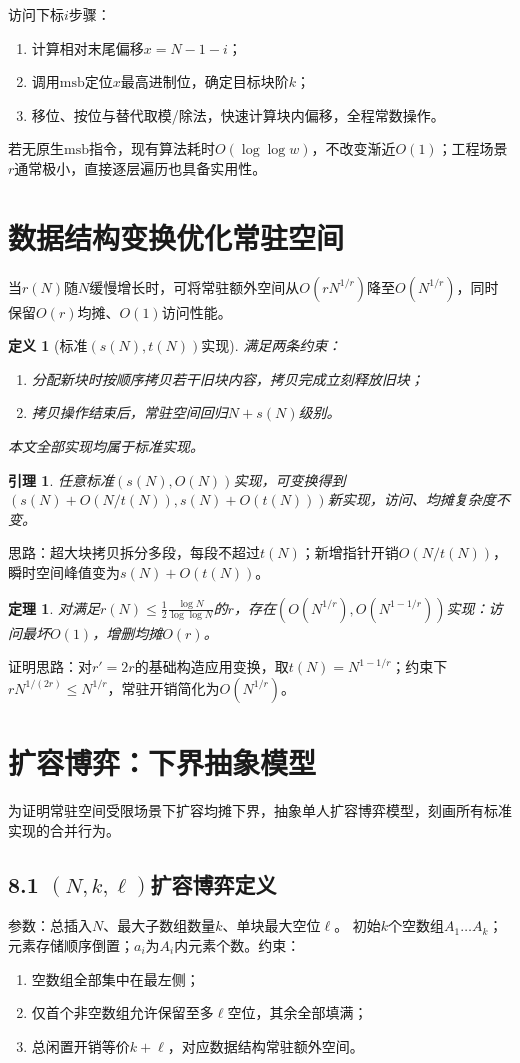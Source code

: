 \documentclass[11pt,a4paper]{article}
\newtheorem{defi}{定义}[section]
\newtheorem{thm}{定理}[section]
\newtheorem{lem}{引理}[section]
\begin{document}
访问下标$i$步骤：
\begin{enumerate}
    \item 计算相对末尾偏移$x=N-1-i$；
    \item 调用$\text{msb}$定位$x$最高进制位，确定目标块阶$k$；
    \item 移位、按位与替代取模/除法，快速计算块内偏移，全程常数操作。
\end{enumerate}
若无原生$\text{msb}$指令，现有算法耗时$O(\log\log w)$，不改变渐近$O(1)$；工程场景$r$通常极小，直接逐层遍历也具备实用性。

\section{数据结构变换优化常驻空间}
当$r(N)$随$N$缓慢增长时，可将常驻额外空间从$O(rN^{1/r})$降至$O(N^{1/r})$，同时保留$O(r)$均摊、$O(1)$访问性能。
\begin{defi}[标准$(s(N),t(N))$实现]
满足两条约束：
\begin{enumerate}
    \item 分配新块时按顺序拷贝若干旧块内容，拷贝完成立刻释放旧块；
    \item 拷贝操作结束后，常驻空间回归$N+s(N)$级别。
\end{enumerate}
本文全部实现均属于标准实现。
\end{defi}

\begin{lem}
任意标准$(s(N),O(N))$实现，可变换得到$(s(N)+O(N/t(N)),s(N)+O(t(N)))$新实现，访问、均摊复杂度不变。
\end{lem}
思路：超大块拷贝拆分多段，每段不超过$t(N)$；新增指针开销$O(N/t(N))$，瞬时空间峰值变为$s(N)+O(t(N))$。

\begin{thm}
对满足$r(N)\le\frac{1}{2}\frac{\log N}{\log\log N}$的$r$，存在$(O(N^{1/r}),O(N^{1-1/r}))$实现：访问最坏$O(1)$，增删均摊$O(r)$。
\end{thm}
证明思路：对$r'=2r$的基础构造应用变换，取$t(N)=N^{1-1/r}$；约束下$rN^{1/(2r)}\le N^{1/r}$，常驻开销简化为$O(N^{1/r})$。

\section{扩容博弈：下界抽象模型}
为证明常驻空间受限场景下扩容均摊下界，抽象单人扩容博弈模型，刻画所有标准实现的合并行为。

\subsection{8.1 \texorpdfstring{$(N,k,\ell)$}{(N,k,l)}扩容博弈定义}
参数：总插入$N$、最大子数组数量$k$、单块最大空位$\ell$。
初始$k$个空数组$A_1\dots A_k$；元素存储顺序倒置；$a_i$为$A_i$内元素个数。约束：
\begin{enumerate}
    \item 空数组全部集中在最左侧；
    \item 仅首个非空数组允许保留至多$\ell$空位，其余全部填满；
    \item 总闲置开销等价$k+\ell$，对应数据结构常驻额外空间。
\end{enumerate}
\end{document}
